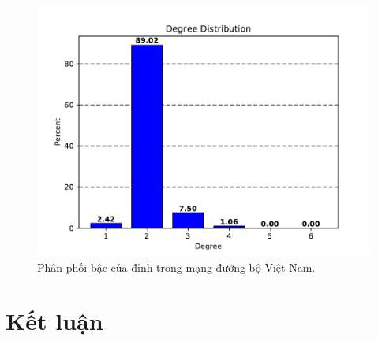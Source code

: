 \documentclass[14pt, oneside, a4paper, openany]{scrartcl}
\begin{document}
\begin{figure}[!h]
	\centering
	\includegraphics[scale=0.8]{figures/degreedist.pdf} 
	\caption[Phân phối bậc của đỉnh trong mạng đường bộ Việt Nam]{Phân phối bậc của đỉnh trong mạng đường bộ Việt Nam.}
	\label{fig:degreedist}
\end{figure}

\section{Kết luận}
\end{document}
